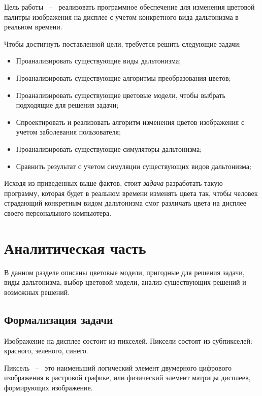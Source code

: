\documentclass[a4paper,14pt, unknownkeysallowed]{extreport}
\begin{document}
    Цель работы ~--~ реализовать программное обеспечение для изменения цветовой палитры изображения на дисплее с учетом конкретного вида дальтонизма в реальном времени.

    Чтобы достигнуть поставленной цели, требуется решить следующие задачи:

    \begin{itemize}
        \item Проанализировать существующие виды дальтонизма;
        \item Проанализировать существующие алгоритмы преобразования цветов;
        \item Проанализировать существующие цветовые модели, чтобы выбрать подходящие для решения задачи;
        \item Спроектировать и реализовать алгоритм изменения цветов изображения с учетом заболевания пользователя;
        \item Проанализировать существующие симуляторы дальтонизма;
        \item Сравнить результат с учетом симуляции существующих видов дальтонизма;
    \end{itemize}

    Исходя из приведенных выше фактов, стоит \textit{задача} разработать такую программу, которая будет в реальном времени изменять цвета так, чтобы человек страдающий конкретным видом дальтонизма смог различать цвета на дисплее своего персонального компьютера.

    \pagebreak

    \chapter{Аналитическая часть}
    В данном разделе описаны цветовые модели, пригодные для решения задачи, виды дальтонизма, выбор цветовой модели, анализ существующих решений и возможных решений.

    \section{Формализация задачи}
    
    Изображение на дисплее состоит из пикселей. Пиксели состоят из субпикселей: красного, зеленого, синего. 
    
    Пиксель ~--~ это наименьший логический элемент двумерного цифрового изображения в растровой графике, или физический элемент матрицы дисплеев, формирующих изображение.
\end{document}
